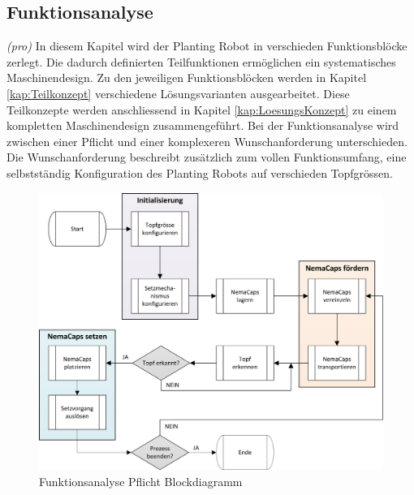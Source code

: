 \subsection{Funktionsanalyse}

\textit{(pro)} In diesem Kapitel wird der Planting Robot in verschieden Funktionsblöcke zerlegt. Die dadurch definierten Teilfunktionen ermöglichen ein systematisches Maschinendesign. Zu den jeweiligen Funktionsblöcken werden in Kapitel \ref{kap:Teilkonzept} verschiedene Lösungsvarianten ausgearbeitet. Diese Teilkonzepte werden anschliessend in Kapitel \ref{kap:LoesungsKonzept} zu einem kompletten Maschinendesign zusammengeführt.\newline
Bei der Funktionsanalyse wird zwischen einer Pflicht und einer komplexeren Wunschanforderung unterschieden. Die Wunschanforderung beschreibt zusätzlich zum vollen Funktionsumfang, eine selbstständig Konfiguration des Planting Robots auf verschieden Topfgrössen.


\begin{figure}[H]
	\includegraphics[width=1\textwidth]{Illustrationen/4-Entwurf/Funktionsanalyse_Pflicht.png}
	\caption{Funktionsanalyse Pflicht Blockdiagramm}
	\label{fig:FunktPflicht}
\end{figure}

